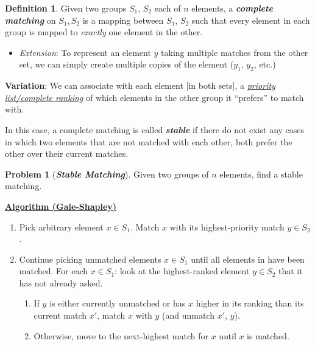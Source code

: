 \documentclass[12pt]{extarticle}
\theoremstyle{definition}
\newtheorem*{definition}{Definition}
\newtheorem*{problem}{Problem}
\theoremstyle{remark}
\newcommand{\probname}[1]{\noindent \textbf{\textit{#1}}}
\newcommand{\probtitle}[1]{\noindent \textbf{\ul{#1}}}
\begin{document}
\begin{definition}
    Given two groups $S_1$, $S_2$ each of $n$ elements,  a \textit{\textbf{complete matching}} on $S_1,S_2$ is a mapping between $S_1$, $S_2$ such that every element in each group is mapped to \textit{exactly} one element in the other. \begin{itemize}
        \item \textit{Extension}: To represent an element $y$ taking multiple matches from the other set, we can simply create multiple copies of the element ($y_1$, $y_2$, etc.)
    \end{itemize}
\end{definition}

\noindent\textbf{Variation}: We can associate with each element [in both sets], a \textit{\ul{priority list/complete ranking}} of which elements in the other group it ``prefers'' to match with. 

In this case, a complete matching is called \textbf{\textit{stable}} if there do not exist any cases in which two elements that are not matched with each other, both prefer the other over their current matches. 

\begin{problem}[\probname{Stable Matching}]
    Given two groups of $n$ elements, find a stable matching. 
\end{problem}

\begin{tcolorbox}[colback=red!20!white]
\probtitle{Algorithm (Gale-Shapley)}
\begin{enumerate}
    \item Pick arbitrary element $x\in S_1$. Match $x$ with its highest-priority match $y\in S_2$. 
    \item Continue picking unmatched elements $x\in S_1$ until all elements in have been matched. For each $x\in S_1$: look at the highest-ranked element $y\in S_2$ that it has not already asked.  \begin{enumerate}
        \item If $y$ is either currently unmatched or has $x$ higher in its ranking than its current match $x'$, match $x$ with $y$ (and unmatch $x'$, $y$). 
        \item Otherwise, move to the next-highest match for $x$ until $x$ is matched.
    \end{enumerate}
\end{enumerate}
\end{tcolorbox}
\end{document}
